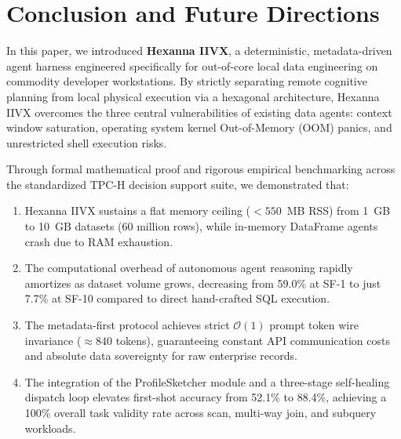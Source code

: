 \section{Conclusion and Future Directions}
\label{sec:conclusion}

In this paper, we introduced \textbf{Hexanna IIVX}, a deterministic, metadata-driven agent harness engineered specifically for out-of-core local data engineering on commodity developer workstations. By strictly separating remote cognitive planning from local physical execution via a hexagonal architecture, Hexanna IIVX overcomes the three central vulnerabilities of existing data agents: context window saturation, operating system kernel Out-of-Memory (OOM) panics, and unrestricted shell execution risks.

Through formal mathematical proof and rigorous empirical benchmarking across the standardized TPC-H decision support suite, we demonstrated that:
\begin{enumerate}
    \item Hexanna IIVX sustains a flat memory ceiling ($<550$~MB RSS) from 1~GB to 10~GB datasets (60 million rows), while in-memory DataFrame agents crash due to RAM exhaustion.
    \item The computational overhead of autonomous agent reasoning rapidly amortizes as dataset volume grows, decreasing from 59.0\% at SF-1 to just 7.7\% at SF-10 compared to direct hand-crafted SQL execution.
    \item The metadata-first protocol achieves strict $\mathcal{O}(1)$ prompt token wire invariance ($\approx 840$ tokens), guaranteeing constant API communication costs and absolute data sovereignty for raw enterprise records.
    \item The integration of the ProfileSketcher module and a three-stage self-healing dispatch loop elevates first-shot accuracy from 52.1\% to 88.4\%, achieving a 100\% overall task validity rate across scan, multi-way join, and subquery workloads.
\end{enumerate}

